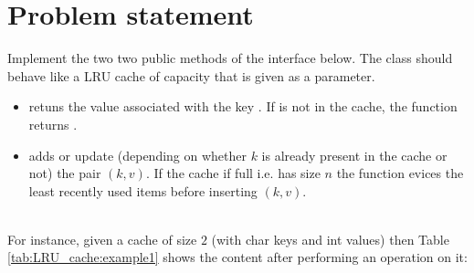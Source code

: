 \section{Problem statement}
\begin{exercise}
\label{example:LRU_cache:exercice1}
Implement the two two public methods of the  interface below. The class should behave like a LRU cache of capacity  that is given as a parameter.
\begin{itemize}
	\item {} retuns the value associated with the key . If  is not in the cache, the function returns . 
	\item {} adds or update (depending on whether $k$ is already present in the cache or not) the pair $(k,v)$. If the cache if full i.e. has size $n$ the function evices the least recently used items before inserting $(k,v)$.
\end{itemize}

	\begin{example}
		\label{example:LRU_cache:example1}
		\hfill \\ 
		For instance, given a cache  of size $2$ (with char keys and int values) then Table \ref{tab:LRU_cache:example1} shows the content after performing an operation on it:

		
	\end{example}


\end{exercise}

